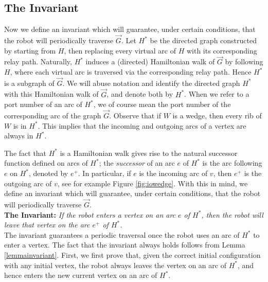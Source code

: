 \documentclass[12pt,letterpaper,oneside]{book}
\begin{document}
\newpage
\subsection{The Invariant}

Now we define an invariant which will guarantee, under certain conditions, that the robot will periodically traverse $\vec{G}$.  
Let $H^*$ be the directed graph constructed by starting from $H$, then replacing every virtual arc of $H$ with its 
corresponding relay path.  Naturally, $H^*$ induces a (directed) Hamiltonian walk of $\vec{G}$ by 
following $H$, where each virtual arc is traversed via the corresponding relay path.  
Hence $H^*$ is a subgraph of $\vec{G}$.  We will abuse 
notation and identify the directed graph $H^*$ with this Hamiltonian walk of $\vec{G}$, and denote both by $H^*$.  When 
we refer to a port number of an arc of $H^*$, we of course mean the port number of the corresponding arc of the graph $\vec{G}$.  
Observe that if $W$ is a wedge, then every 
rib of $W$ is in $H^*$.  This implies that the incoming and outgoing arcs of a vertex are always in $H^*$.  

The fact that $H^*$ is a Hamiltonian walk gives rise to the natural successor function defined 
on arcs of $H^*$; the \emph{successor} of an arc $e$ of $H^*$ is the arc following $e$ on $H^*$, denoted by $e^+$.  
In particular, if $e$ is the incoming arc of $v$, then $e^+$ is the outgoing arc of $v$, see for example Figure \ref{fig:iowedge}.  
With this in mind, we define an invariant which will 
guarantee, under certain conditions, that the robot will periodically traverse $\vec{G}$. \\

\noindent \textbf{The Invariant:} \emph{If the robot enters a vertex on an arc $e$ of $H^*$, 
then the robot will leave that vertex on the arc $e^+$ of $H^*$.  }\\

The invariant guarantees a periodic traversal once the 
robot uses an arc of $H^*$ to enter a vertex.  The fact that 
the invariant always holds follows from Lemma \ref{lemmainvariant}.  First, we first prove that, given 
the correct initial configuration with any initial vertex, the robot always 
leaves the vertex on an arc of $H^*$, and hence enters the new current vertex on an arc of $H^*$.  
\end{document}
